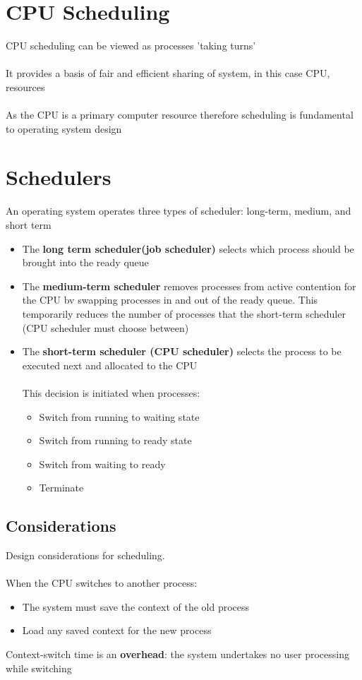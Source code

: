 \documentclass{article}[18pt]
\begin{document}
\section{CPU Scheduling}
CPU scheduling can be viewed as processes 'taking turns'\\
\\
It provides a basis of fair and efficient sharing of system, in this case CPU, resources\\
\\
As the CPU is a primary computer resource therefore scheduling is fundamental to operating system design
\section{Schedulers}
An operating system operates three types of scheduler: long-term, medium, and short term
\begin{itemize}
\item The \textbf{long term scheduler(job scheduler)} selects which process should be brought into the ready queue
\item The \textbf{medium-term scheduler} removes processes from active contention for the CPU bv swapping processes in and out of the ready queue. This temporarily reduces the number of processes that the short-term scheduler (CPU scheduler must choose between)
\item The \textbf{short-term scheduler (CPU scheduler)} selects the process to be executed next and allocated to the CPU\\
\\
This decision is initiated when processes:
\begin{itemize}
\item Switch from running to waiting state
\item Switch from running to ready state
\item Switch from waiting to ready
\item Terminate
\end{itemize}
\end{itemize}
\subsection{Considerations}
Design considerations for scheduling.\\
\\
When the CPU switches to another process:
\begin{itemize}
\item The system must save the context of the old process
\item Load any saved context for the new process
\end{itemize}
Context-switch time is an \textbf{overhead}: the system undertakes no user processing while switching
\end{document}
